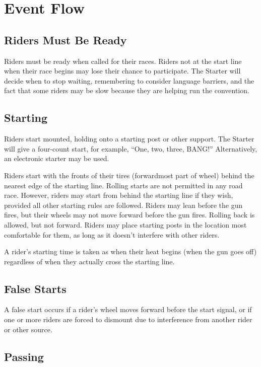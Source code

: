 \section{Event Flow}

\subsection{Riders Must Be Ready}

Riders must be ready when called for their races.
Riders not at the start line when their race begins may lose their chance to participate.
The Starter will decide when to stop waiting, remembering to consider language barriers, and the fact that some riders may be slow because they are helping run the convention.

\subsection{Starting}

Riders start mounted, holding onto a starting post or other support.
The Starter will give a four-count start, for example, ``One, two, three, BANG!'' Alternatively, an electronic starter may be used.

Riders start with the fronts of their tires (forwardmost part of wheel) behind the nearest edge of the starting line.
Rolling starts are not permitted in any road race.
However, riders may start from behind the starting line if they wish, provided all other starting rules are followed.
Riders may lean before the gun fires, but their wheels may not move forward before the gun fires.
Rolling back is allowed, but not forward.
Riders may place starting posts in the location most comfortable for them, as long as it doesn't interfere with other riders.

A rider's starting time is taken as when their heat begins (when the gun goes off) regardless of when they actually cross the starting line.

\subsection{False Starts}

A false start occurs if a rider's wheel moves forward before the start signal, or if one or more riders are forced to dismount due to interference from another rider or other source.

\subsection{Passing}

